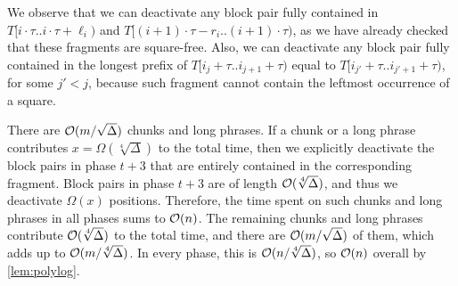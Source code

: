 We observe that we can deactivate any block pair fully contained in $T[i\cdot \tau.. i\cdot \tau+\ell_{i})$ and $T[(i+1)\cdot \tau-r_{i} .. (i+1)\cdot \tau)$,
as we have already checked that these fragments are square-free.
Also, we can deactivate any block pair fully contained in 
the longest prefix of $T[i_{j}+\tau.. i_{j+1}+\tau)$ equal to $T[i_{j'}+\tau.. i_{j'+1}+\tau)$, for some $j'<j$,
because such fragment cannot contain the leftmost occurrence of a square. 

There are $\mathcal{O}(m / \sqrt{\Delta})$ chunks and long phrases. If a chunk or a long phrase
contributes $x = \Omega(\sqrt[4]{\Delta})$ to the total time, then we explicitly deactivate the block pairs in phase $t + 3$
that are entirely contained in the corresponding fragment. Block pairs in phase $t + 3$ are of length $\mathcal{O}(\sqrt[4]{\Delta})$,
and thus we deactivate $\Omega(x)$ positions.
Therefore, the time spent on such chunks and long phrases in all phases sums to $\mathcal{O}(n)$.
The remaining chunks and long phrases contribute $\mathcal{O}(\sqrt[4]{\Delta})$ to the total time,
and there are $\mathcal{O}(m / \sqrt{\Delta})$ of them, which adds up to $\mathcal{O}(m / \sqrt[4]{\Delta})$.
In every phase, this is $\mathcal{O}(n/\sqrt[4]{\Delta})$, so $\mathcal{O}(n)$ overall by \cref{lem:polylog}.
